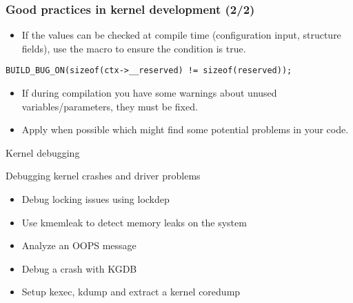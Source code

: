 \begin{frame}[fragile]
  \frametitle{Good practices in kernel development (2/2)}
  \begin{itemize}
    \item If the values can be checked at compile time (configuration input,
           structure fields), use the  macro to
          ensure the condition is true.
  \end{itemize}
  \begin{block}{}
    \begin{verbatim}
BUILD_BUG_ON(sizeof(ctx->__reserved) != sizeof(reserved));
    \end{verbatim}
  \end{block}
  \begin{itemize}
    \item If during compilation you have some warnings about unused
          variables/parameters, they must be fixed.
    \item Apply  when possible which might find some
          potential problems in your code.
  \end{itemize}
\end{frame}

\setuplabframe
{Kernel debugging}
{
  Debugging kernel crashes and driver problems
  \begin{itemize}
    \item Debug locking issues using lockdep
    \item Use kmemleak to detect memory leaks on the system
    \item Analyze an OOPS message
    \item Debug a crash with KGDB
    \item Setup kexec, kdump and extract a kernel coredump
  \end{itemize}
}
